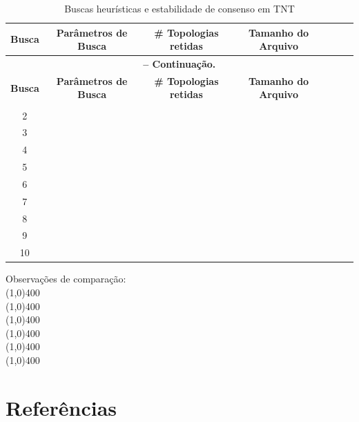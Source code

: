 \begin{refsection}
\pagestyle{fancy}
\begin{center}

\begin{longtable}{|c|c|c|c|c|c|c|}
\caption[Tabela \ref{tut6:table:stability}: Buscas heurísticas e estabilidade de consenso em TNT]{Buscas heurísticas e estabilidade de consenso em TNT} \label{tut6:table:stability} \\


\hline\hline \textbf{Busca} & \textbf{Parâmetros de Busca}  & \textbf{\# Topologias retidas} & \textbf{Tamanho do Arquivo}\\
\endfirsthead

\multicolumn{6}{c}{{\bfseries \tablename\ \thetable{} -- Continuação.}}\\
\hline\hline \textbf{Busca} & \textbf{Parâmetros de Busca}  & \textbf{\# Topologias retidas} & \textbf{Tamanho do Arquivo}\\
\endhead
\hline \hline
\endlastfoot

\hline1 &  &  & \\
\hline2 &  &  & \\
\hline3 &  &  & \\
\hline4 &  &  & \\
\hline5 &  &  & \\
\hline6 &  &  & \\
\hline7 &  &  & \\
\hline8 &  &  & \\
\hline9 &  &  & \\
\hline10 &  &  & \\

\end{longtable}
\end{center}

	
Observações de comparação:\\
	\line(1,0){400}\\
	\line(1,0){400}\\
	\line(1,0){400}\\
	\line(1,0){400}\\
	\line(1,0){400}\\
	\line(1,0){400}\\
\vspace{1cm}
\section{Referências}\label{tut6:refs}
\printbibliography[heading=none]
\end{refsection}
%

